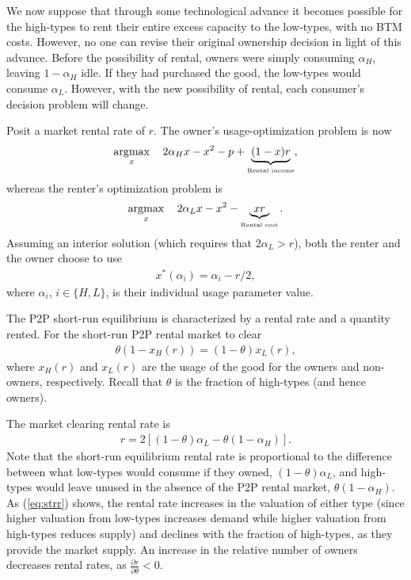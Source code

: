 \documentclass[11pt]{article}
\DeclareMathOperator*{\argmax}{\arg\!\max}
\begin{document}
We now suppose that through some technological advance it becomes possible for the high-types to rent their entire excess capacity to the low-types, with no BTM costs.
However, no one can revise their original ownership decision in light of this advance. 
Before the possibility of rental, owners were simply consuming $\alpha_H$, leaving $1-\alpha_H$ idle.
If they had purchased the good, the low-types would consume $\alpha_L$. 
However, with the new possibility of rental, each consumer's decision problem will change. 

Posit a market rental rate of $r$. 
The owner's usage-optimization problem is now 
\begin{align}
\argmax_x \quad 2\alpha_H x - x^2 -p + \underbrace{(1-x)r}_{\mbox{{\tiny Rental income}}},   \nonumber 
\end{align} 
whereas the renter's optimization problem is 
\begin{align}
\argmax_x \quad 2 \alpha_L x - x^2 - \underbrace{xr}_{\mbox{{\tiny Rental cost}}}.  \nonumber
\end{align} 
Assuming an interior solution (which requires that $2\alpha_L > r$), both the renter and the owner choose to use
\begin{align}
x^*(\alpha_i) = \alpha_i - r/2, 
\end{align} 
where $\alpha_i$, $i \in \{H,L\}$, is their individual usage parameter value. 

The P2P short-run equilibrium is characterized by a rental rate and a quantity rented. 
For the short-run P2P rental market to clear 
\begin{align}
  \theta \left( 1 - x_H(r) \right) = (1-\theta) x_L(r),
\end{align}
where $x_H(r)$ and $x_L(r)$ are the usage of the good for the owners and non-owners, respectively.
Recall that $\theta$ is the fraction of high-types (and hence owners).

The market clearing rental rate is 
\begin{align} \label{eq:strr} 
r = 2\left[ (1-\theta)\alpha_L - \theta (1-\alpha_H) \right]. 
\end{align}
Note that the short-run equilibrium rental rate is proportional to the difference between what low-types would consume if they owned, $(1-\theta)\alpha_L$, and high-types would leave unused in the absence of the P2P rental market, $\theta (1-\alpha_H)$. 
As (\ref{eq:strr}) shows, the rental rate increases in the valuation of either type (since higher valuation from low-types increases demand while higher valuation from high-types reduces supply) and declines with the fraction of high-types, as they provide the market supply. 
An increase in the relative number of owners decreases rental rates, as $\frac{\partial r}{\partial \theta} < 0$. 
\end{document}
